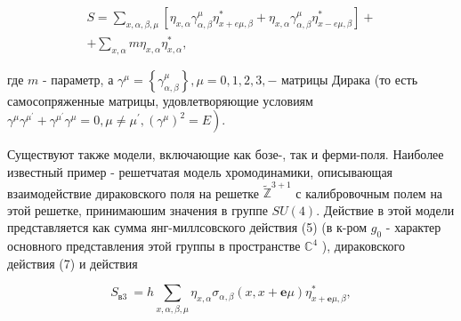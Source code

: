 \documentclass[10pt]{article}
\begin{document}
\[

\begin{gathered}

S=\sum_{x, \alpha, \beta, \mu}\left[\eta_{x, \alpha} \gamma_{\alpha, \beta}^{\mu} \eta_{x+e \mu, \beta}^{*}+\eta_{x, \alpha} \gamma_{\alpha, \beta}^{\mu} \eta_{x-e \mu, \beta}^{*}\right]+ \\

+\sum_{x, \alpha} m \eta_{x, \alpha} \eta_{x, \alpha}^{*},

\end{gathered}

\]



где $m$ - параметр, а $\gamma^{\mu}=\left\{\gamma_{\alpha, \beta}^{\mu}\right\}, \mu=0,1,2,3,-$ матрицы Дирака (то есть самосопряженные матрицы, удовлетворяющие условиям $\left.\gamma^{\mu} \gamma^{\mu^{\prime}}+\gamma^{\mu^{\prime}} \gamma^{\mu}=0, \mu \neq \mu^{\prime},\left(\gamma^{\mu}\right)^{2}=E\right)$.



Существуют также модели, включающие как бозе-, так и ферми-поля. Наиболее известный пример - решетчатая модель хромодинамики, описывающая взаимодействие дираковского поля на решетке $\widetilde{\mathbb{Z}}^{3+1}$ с калибровочным полем на этой решетке, принимаюшим значения в группе $S U(4)$. Действие в этой модели представляется как сумма янг-миллсовского действия (5) (в к-ром $g_{0}$ - характер основного представления этой группы в пространстве $\mathbb{C}^{4}$ ), дираковского действия (7) и действия



\[

S_{\text {в3 }}=h \sum_{x, \alpha, \beta, \mu} \eta_{x, \alpha} \sigma_{\alpha, \beta}(x, x+\boldsymbol{e} \mu) \eta_{x+\boldsymbol{e} \mu, \beta}^{*},

\]
\end{document}
